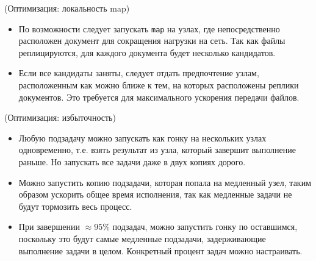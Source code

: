 \begin{algorithm}(Оптимизация: локальность map)
    \begin{itemize}
        \item По возможности следует запускать \texttt{map} на узлах, где
            непосредственно расположен документ для сокращения нагрузки на сеть. Так как
            файлы реплицируются, для каждого документа будет несколько кандидатов.
        \item Если все кандидаты заняты, следует отдать предпочтение узлам,
            расположенным как можно ближе к тем, на которых расположены реплики
            документов. Это требуется для максимального ускорения передачи файлов.
    \end{itemize}
\end{algorithm}

\begin{algorithm}(Оптимизация: избыточность)
    \begin{itemize}
        \item Любую подзадачу можно запускать как гонку на нескольких узлах
            одновременно, т.е. взять результат из узла, который завершит выполнение
            раньше. Но запускать все задачи даже в двух копиях дорого.
        \item Можно запустить копию подзадачи, которая попала на медленный узел,
            таким образом ускорить общее время исполнения, так как медленные задачи не будут тормозить весь процесс.
        \item При завершении $\approx 95\%$ подзадач, можно запустить гонку по
            оставшимся, поскольку это будут самые медленные подзадачи, задерживающие
            выполнение задачи в целом. Конкретный процент задач можно настраивать.
    \end{itemize}
\end{algorithm}
